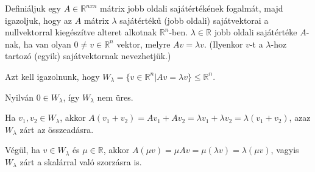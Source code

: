 \begin{frame}
  \begin{tcolorbox}[title={15. (4p)}]
       Definiáljuk egy $A \in \mathbb{R}^{n x n}$ mátrix jobb oldali sajátértékének fogalmát, majd igazoljuk, hogy az $A$ mátrix ${\lambda}$ sajátértékű (jobb oldali) sajátvektorai a nullvektorral kiegészítve alteret alkotnak $\mathbb{R}^n$-ben.
  \tcblower
    ${\lambda} \in \mathbb{R}$ jobb oldali sajátértéke $A$-nak, ha van olyan $0 \neq v \in \mathbb{R}^n$ vektor, melyre $Av = {\lambda}v$. (Ilyenkor $v$-t a ${\lambda}$-hoz tartozó (egyik) sajátvektornak nevezhetjük.)\\
    \mmedskip
    
    Azt kell igazolnunk, hogy $W_{\lambda} = \{v \in \mathbb{R}^n |Av = {\lambda}v\} \leq \mathbb{R}^n$.\\
    \mmedskip
    
    Nyilván $0 \in W_{\lambda}$, így $W_{\lambda}$ nem üres.\\
    \mmedskip
    
    Ha $v_1,v_2 \in W_{\lambda}$, akkor $A(v_1 +v_2) = Av_1 +Av_2 = {\lambda}v_1 +{\lambda}v_2 = {\lambda}(v_1 +v_2)$, azaz $W_{\lambda}$ zárt az összeadásra.\\
    \mmedskip
    
    Végül, ha $v \in W_{\lambda}$ és ${\mu} \in \mathbb{R}$, akkor $A({\mu}v) = {\mu}Av = {\mu}({\lambda}v) = {\lambda}({\mu}v)$, vagyis $W_{\lambda}$ zárt a skalárral való szorzásra is.
  \end{tcolorbox}
\end{frame}



